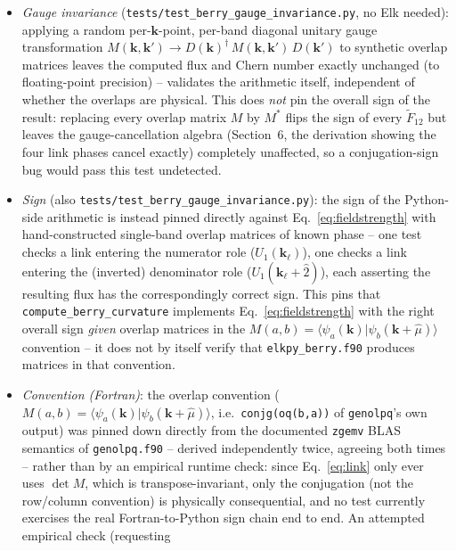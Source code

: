 \documentclass[11pt]{article}
\begin{document}
\begin{itemize}
  \item \emph{Gauge invariance} (\texttt{tests/test\_berry\_gauge\_invariance.py}, no
    Elk needed): applying a random per-$\mathbf k$-point, per-band diagonal unitary
    gauge transformation $M(\mathbf k,\mathbf k') \to D(\mathbf k)^\dagger\, M(\mathbf
    k,\mathbf k')\, D(\mathbf k')$ to synthetic overlap matrices leaves the computed
    flux and Chern number exactly unchanged (to floating-point precision) -- validates
    the arithmetic itself, independent of whether the overlaps are physical. This does
    \emph{not} pin the overall sign of the result: replacing every overlap matrix $M$
    by $M^*$ flips the sign of every $\tilde F_{12}$ but leaves the gauge-cancellation
    algebra (Section~6, the derivation showing the four link phases cancel exactly)
    completely unaffected, so a conjugation-sign bug would pass this test undetected.
  \item \emph{Sign} (also \texttt{tests/test\_berry\_gauge\_invariance.py}): the sign of
    the Python-side arithmetic is instead pinned directly against Eq.~\eqref{eq:fieldstrength}
    with hand-constructed single-band overlap matrices of known phase -- one test checks
    a link entering the numerator role ($U_1(\mathbf k_\ell)$), one checks a link entering
    the (inverted) denominator role ($U_1(\mathbf k_\ell+\hat 2)$), each asserting the
    resulting flux has the correspondingly correct sign. This pins that
    \texttt{compute\_berry\_curvature} implements Eq.~\eqref{eq:fieldstrength} with the
    right overall sign \emph{given} overlap matrices in the
    $M(a,b)=\langle\psi_a(\mathbf k)|\psi_b(\mathbf k+\hat\mu)\rangle$ convention -- it
    does not by itself verify that \texttt{elkpy\_berry.f90} produces matrices in that
    convention.
  \item \emph{Convention (Fortran)}: the overlap convention
    ($M(a,b)=\langle\psi_a(\mathbf k)|\psi_b(\mathbf k+\hat\mu)\rangle$, i.e.\
    \texttt{conjg(oq(b,a))} of \texttt{genolpq}'s own output) was pinned down directly
    from the documented \texttt{zgemv} BLAS semantics of \texttt{genolpq.f90} --
    derived independently twice, agreeing both times -- rather than by an empirical
    runtime check: since Eq.~\eqref{eq:link} only ever uses $\det M$, which is
    transpose-invariant, only the conjugation (not the row/column convention) is
    physically consequential, and no test currently exercises the real
    Fortran-to-Python sign chain end to end. An attempted empirical check (requesting

\end{itemize}
\end{document}
